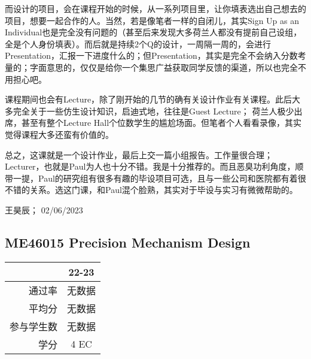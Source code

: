 而设计的项目，会在课程开始的时候，从一系列项目里，让你填表选出自己想去的项目，想要一起合作的人。当然，若是像笔者一样的自闭儿，其实Sign Up as an Individual也是完全没有问题的（甚至后来发现大多荷兰人都没有提前自己设组，全是个人身份填表）。而后就是持续2个Q的设计，一周隔一周的，会进行Presentation，汇报一下进度什么的；但Presentation，其实是完全不会纳入分数考量的；字面意思的，仅仅是给你一个集思广益获取同学反馈的渠道，所以也完全不用担心吧。

课程期间也会有Lecture，除了刚开始的几节的确有关设计作业有关课程。此后大多完全关于一些仿生设计知识，启迪式地，往往是Guest Lecture； 荷兰人极少出席，甚至有整个Lecture Hall个位数学生的尴尬场面。但笔者个人看看录像，其实觉得课程大多还蛮有价值的。

总之，这课就是一个设计作业，最后上交一篇小组报告。工作量很合理；Lecturer，也就是Paul为人也十分不错。我是十分推荐的。而且恶臭功利角度，顺带一提，Paul的研究组有很多有趣的毕设项目可选，且与一些公司和医院都有着很不错的关系。选这门课，和Paul混个脸熟，其实对于毕设与实习有微微帮助的。
\begin{flushright}
王昊辰； 02/06/2023
\end{flushright}

\subsection{ME46015 Precision Mechanism Design}\hypertarget{ME46015}{} 
\begin{minipage}{0.45\textwidth}
\centering
{}
\end{minipage}%
\begin{minipage}{0.45\textwidth}
\raggedleft
\begin{tabular}{r|c}
\textbf{ } & \textbf{22-23} \\ \hline
通过率 &无数据 \\ 
平均分 &无数据  \\ 
参与学生数 &无数据  \\ 
学分 &4  EC\\
\end{tabular}
\end{minipage}\\

